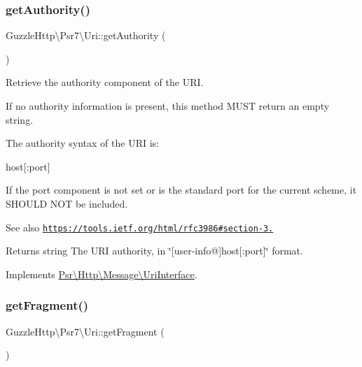 \subsubsection{\texorpdfstring{get\+Authority()}{getAuthority()}}
{\footnotesize\ttfamily Guzzle\+Http\textbackslash{}\+Psr7\textbackslash{}\+Uri\+::get\+Authority (\begin{DoxyParamCaption}{ }\end{DoxyParamCaption})}

Retrieve the authority component of the U\+RI.

If no authority information is present, this method M\+U\+ST return an empty string.

The authority syntax of the U\+RI is\+:


\begin{DoxyPre}
host[:port]
\end{DoxyPre}


If the port component is not set or is the standard port for the current scheme, it S\+H\+O\+U\+LD N\+OT be included.

\begin{DoxySeeAlso}{See also}
\href{https://tools.ietf.org/html/rfc3986#section-3.2}{\tt https\+://tools.\+ietf.\+org/html/rfc3986\#section-\/3.} 
\end{DoxySeeAlso}
\begin{DoxyReturn}{Returns}
string The U\+RI authority, in \char`\"{}\mbox{[}user-\/info@\mbox{]}host\mbox{[}\+:port\mbox{]}\char`\"{} format. 
\end{DoxyReturn}


Implements \hyperlink{interfacePsr_1_1Http_1_1Message_1_1UriInterface_a2c32fd7d98677e1fb5d31d6d24ad937a}{Psr\textbackslash{}\+Http\textbackslash{}\+Message\textbackslash{}\+Uri\+Interface}.

\mbox{\label{classGuzzleHttp_1_1Psr7_1_1Uri_aeda26bc60e5aef6d506ce43be28409ca}} 
\subsubsection{\texorpdfstring{get\+Fragment()}{getFragment()}}
{\footnotesize\ttfamily Guzzle\+Http\textbackslash{}\+Psr7\textbackslash{}\+Uri\+::get\+Fragment (\begin{DoxyParamCaption}{ }\end{DoxyParamCaption})}

